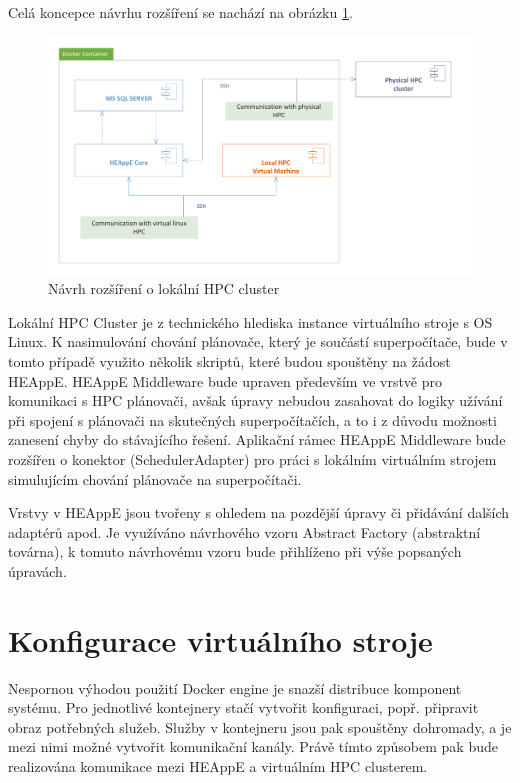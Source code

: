 Celá koncepce návrhu rozšíření se nachází na obrázku \ref{fig:navrh-rozsireni-o-lokalni-hpc-clsuter}.

\newpage
\begin{figure}
	\centering
	\includegraphics[width=1.0\textwidth]{Figures/main-docker-container-view.pdf}
	\caption{Návrh rozšíření o lokální HPC cluster}
	\label{fig:navrh-rozsireni-o-lokalni-hpc-clsuter}
\end{figure}

Lokální HPC Cluster je z technického hlediska instance virtuálního stroje s OS Linux. K nasimulování chování plánovače, který je součástí superpočítače, bude v tomto případě využito několik skriptů, které budou spouštěny na žádost HEAppE. HEAppE Middleware bude upraven především ve vrstvě pro komunikaci s HPC plánovači, avšak úpravy nebudou zasahovat do logiky užívání při spojení s plánovači na skutečných superpočítačích, a to i z důvodu možnosti zanesení chyby do stávajícího řešení. Aplikační rámec HEAppE Middleware bude rozšířen o konektor (SchedulerAdapter) pro práci s lokálním virtuálním strojem simulujícím chování plánovače na superpočítači.

Vrstvy v HEAppE jsou tvořeny s ohledem na pozdější úpravy či přidávání dalších adaptérů apod. Je využíváno návrhového vzoru Abstract Factory (abstraktní továrna), k tomuto návrhovému vzoru bude přihlíženo při výše popsaných úpravách.

\section{Konfigurace virtuálního stroje}
Nespornou výhodou použití Docker engine je snazší distribuce komponent systému. Pro jednotlivé kontejnery stačí vytvořit konfiguraci, popř. připravit obraz potřebných služeb. Služby v kontejneru jsou pak spouštěny dohromady, a je mezi nimi možné vytvořit komunikační kanály. Právě tímto způsobem pak bude realizována komunikace mezi HEAppE a virtuálním HPC clusterem.

